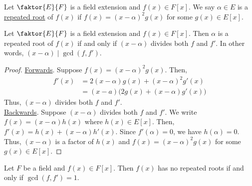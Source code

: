 \documentclass[11pt]{article}
\newcommand{\quotient}[2]{\faktor{#1}{#2}}
\begin{document}
\begin{definition}
Let $\quotient{E}{F}$ is a field extension and $f(x) \in F[x]$. We say
$\alpha \in E$ is a \underline{repeated root} of $f(x)$ if $f(x) =
(x-\alpha)^2g(x)$ for some $g(x) \in E[x]$.
\end{definition}
\begin{theorem}
Let $\quotient{E}{F}$ is a field extension and $f(x) \in F[x]$. Then $\alpha$ is
a repeated root of $f(x)$ if and only if $(x -\alpha)$ divides both $f$ and
$f'$. In other words, $(x - \alpha) \mid \gcd(f,f')$.
\label{theorem19}
\end{theorem}
\begin{proof}
\underline{Forwards}. Suppose $f(x) = (x-\alpha)^2g(x)$. Then,
\begin{align*}
f'(x) &= 2(x-\alpha)g(x) + (x-\alpha)^2g'(x)\\
&= (x-a) \big(2g(x) + (x-\alpha)g'(x) \big)
\end{align*}
Thus, $(x-\alpha)$ divides both $f$ and $f'$.\\
\underline{Backwards}. Suppose $(x-\alpha)$ divides both $f$ and $f'$. We write
$f(x) = (x-\alpha)h(x)$ where $h(x) \in E[x]$. Then, $f'(x) = h(x) +
(x-\alpha)h'(x)$. Since $f'(\alpha) = 0$, we have $h(\alpha) = 0$. Thus,
$(x-\alpha)$ is a factor of $h(x)$ and $f(x) = (x-\alpha)^2g(x)$ for some
$g(x) \in E[x]$.
\end{proof}
\begin{corollary}
Let $F$ be a field and $f(x) \in F[x]$. Then $f(x)$ has no repeated roots if and
only if $\gcd(f, f') = 1$.
\label{corollary20}
\end{corollary}
\end{document}
